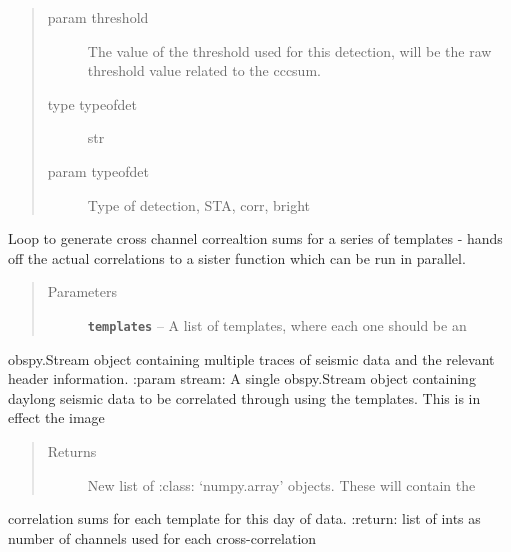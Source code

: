 \documentclass[a4paper,10pt,english]{sphinxmanual}
\begin{document}
\begin{fulllineitems}
\begin{description}
\begin{quote}
\begin{description}
\item[{param threshold}] \leavevmode
The value of the threshold used for this detection,        will be the raw threshold value related to the cccsum.

\item[{type typeofdet}] \leavevmode
str

\item[{param typeofdet}] \leavevmode
Type of detection, STA, corr, bright

\end{description}\end{quote}

\end{description}

\end{fulllineitems}


\begin{fulllineitems}
\label{modules:match_filter._channel_loop}
Loop to generate cross channel correaltion sums for a series of templates -
hands off the actual correlations to a sister function which can be run in
parallel.
\begin{quote}\begin{description}
\item[{Parameters}] \leavevmode
\textbf{\texttt{templates}} -- A list of templates, where each one should be an

\end{description}\end{quote}

obspy.Stream object containing multiple traces of seismic data and the
relevant header information.
:param stream: A single obspy.Stream object containing daylong seismic data
to be correlated through using the templates.  This is in effect the image
\begin{quote}\begin{description}
\item[{Returns}] \leavevmode
New list of :class: `numpy.array' objects.  These will contain the

\end{description}\end{quote}

correlation sums for each template for this day of data.
:return: list of ints as number of channels used for each cross-correlation

\end{fulllineitems}
\end{document}
